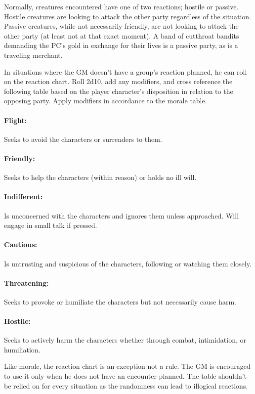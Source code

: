 \begin{multicols}{2}
Normally, creatures encountered have one of two reactions; hostile or passive.  Hostile creatures are looking to attack the other party regardless of the situation.  Passive creatures, while not necessarily friendly, are not looking to attack the other party (at least not at that exact moment).  A band of cutthroat bandits demanding the PC's gold in exchange for their lives is a passive party, as is a traveling merchant.

In situations where the GM doesn't have a group's reaction planned, he can roll on the reaction chart.  Roll 2d10, add any modifiers, and cross reference the following table based on the player character's disposition in relation to the opposing party.  Apply modifiers in accordance to the morale table.

\paragraph{Flight:} Seeks to avoid the characters or surrenders to them.

\paragraph{Friendly:} Seeks to help the characters (within reason) or holds no ill will.

\paragraph{Indifferent:} Is unconcerned with the characters and ignores them unless approached.  Will engage in small talk if pressed.

\paragraph{Cautious:} Is untrusting and suspicious of the characters, following or watching them closely.

\paragraph{Threatening:} Seeks to provoke or humiliate the characters but not necessarily cause harm.

\paragraph{Hostile:} Seeks to actively harm the characters whether through combat, intimidation, or humiliation.

Like morale, the reaction chart is an exception not a rule.  The GM is encouraged to use it only when he does not have an encounter planned.  The table shouldn't be relied on for every situation as the randomness can lead to illogical reactions.

\end{multicols}

